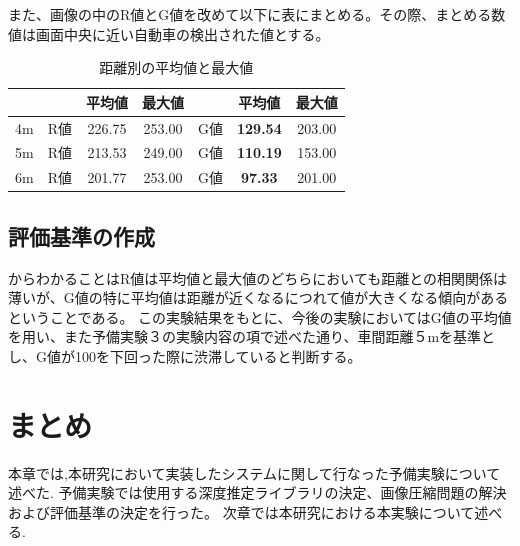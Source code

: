 
また、画像の中のR値とG値を改めて以下に表にまとめる。その際、まとめる数値は画面中央に近い自動車の検出された値とする。

\begin{table}[htbp]
  \centering
  \begin{scriptsize}
  \begin{tabular}{ccccccc}
  \toprule
& & 平均値 & 最大値 & & 平均値 & 最大値 \\
  \midrule
4m & R値 & 226.75 & 253.00 & G値 & {\bf129.54} & 203.00 \\
5m & R値 & 213.53 & 249.00 & G値 & {\bf 110.19} & 153.00 \\
6m & R値 & 201.77 & 253.00 & G値 & {\bf 97.33} & 201.00\\
  \bottomrule
  \end{tabular}
  \end{scriptsize}
  \caption{距離別の平均値と最大値}
  \label{tab:mean_max}
\end{table}

\subsection{評価基準の作成}
からわかることはR値は平均値と最大値のどちらにおいても距離との相関関係は薄いが、G値の特に平均値は距離が近くなるにつれて値が大きくなる傾向があるということである。
この実験結果をもとに、今後の実験においてはG値の平均値を用い、また予備実験３の実験内容の項で述べた通り、車間距離５mを基準とし、G値が100を下回った際に渋滞していると判断する。

\section{まとめ}
本章では,本研究において実装したシステムに関して行なった予備実験について述べた.
予備実験では使用する深度推定ライブラリの決定、画像圧縮問題の解決および評価基準の決定を行った。
次章では本研究における本実験について述べる.